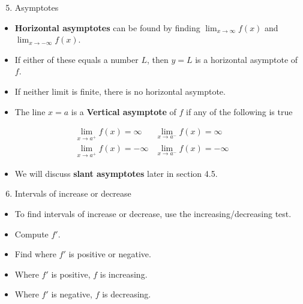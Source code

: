 \begin{frame}[t]
\begin{enumerate}
\setcounter{enumi}{4}
\item  Asymptotes
\end{enumerate}
\begin{itemize}
\item  \textbf{Horizontal asymptotes} can be found by finding $\lim_{x\to\infty} f(x)$ and $\lim_{x\to -\infty} f(x)$.
\item  If either of these equals a number $L$, then $y = L$ is a horizontal asymptote of $f$.  
\item  If neither limit is finite, there is no horizontal asymptote.
\item  The line $x = a$ is a \textbf{Vertical asymptote} of $f$ if any of the following is true
\end{itemize}
\[
\begin{array}{ll}
\displaystyle \lim_{x\to a^+}f(x) = \infty &%
\displaystyle \lim_{x\to a^-}f(x) = \infty \\%
\displaystyle \lim_{x\to a^+}f(x) = -\infty &%
\displaystyle \lim_{x\to a^-}f(x) = -\infty %
\end{array}
\]
\begin{itemize}
\item  We will discuss \textbf{slant asymptotes} later in section 4.5.
\end{itemize}
\end{frame}


\begin{frame}[t]
\begin{enumerate}
\setcounter{enumi}{5}
\item  Intervals of increase or decrease
\end{enumerate}
\begin{itemize}
\item  To find intervals of increase or decrease, use the increasing/decreasing test.
\item  Compute $f'$.
\item  Find where $f'$ is positive or negative.
\item  Where $f'$ is positive, $f$ is increasing.
\item  Where $f'$ is negative, $f$ is decreasing.
\end{itemize}
\end{frame}




